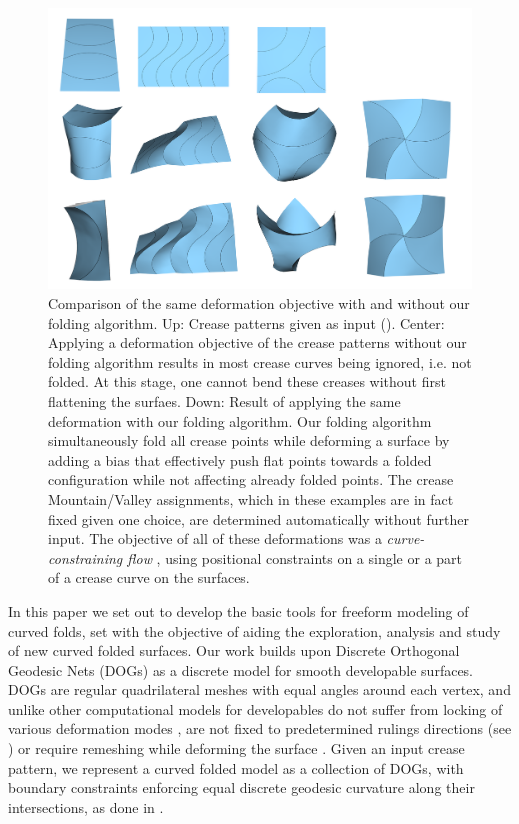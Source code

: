 \begin{figure} [h]
	\centering
	\includegraphics[width=\linewidth]{figures/fold_bias_compare}
	\caption{Comparison of the same deformation objective with and without our folding algorithm. Up: Crease patterns given as input (). Center: Applying a deformation objective of the crease patterns without our folding algorithm results in most crease curves being ignored, i.e. not folded. At this stage, one cannot bend these creases without first flattening the surfaes. Down: Result of applying the same deformation with our folding algorithm. Our folding algorithm simultaneously fold all crease points while deforming a surface by adding a bias that effectively push flat points towards a folded configuration while not affecting already folded points. The crease Mountain/Valley assignments, which in these examples are in fact fixed given one choice, are determined automatically without further input. The objective of all of these deformations was a  \textit{curve-constraining flow} \cite{rabi2018shape}, using positional constraints on a single or a part of a crease curve on the surfaces.}
	\label{fig:folded_and_not_folded}
\end{figure}

In this paper we set out to develop the basic tools for freeform modeling of curved folds, set with the objective of aiding the exploration, analysis and study of new curved folded surfaces. Our work builds upon Discrete Orthogonal Geodesic Nets (DOGs) \cite{rabi18,rabi2018shape} as a discrete model for smooth developable surfaces. DOGs are regular quadrilateral meshes with equal angles around each vertex, and unlike other computational models for developables do not suffer from locking of various deformation modes \cite{locking1,locking2,grin_shells}, are not fixed to predetermined rulings directions \cite{pottmann_new,curved_folding_kilian} (see ) or require remeshing while deforming the surface \cite{StringActuated:2017,SchreckEG2017,Narain}. Given an input crease pattern, we represent a curved folded model as a collection of DOGs, with boundary constraints enforcing equal discrete geodesic curvature along their intersections, as done in \cite{rabi2018shape}.

